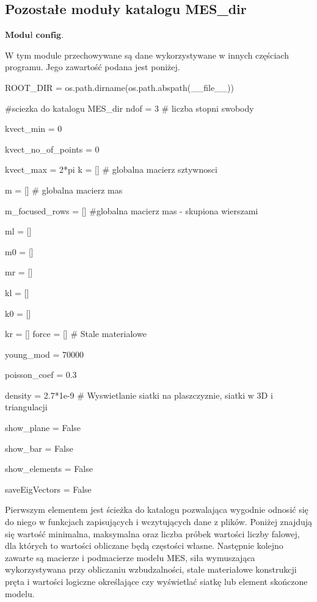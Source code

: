 
\subsection{Pozostałe moduły katalogu MES\_dir}
\label{cha:pozostale_moduly}

 \( \textbf{Moduł config} \).

W tym module przechowywane są dane wykorzystywane w innych częściach programu. Jego zawartość podana jest poniżej.

\vspace {3mm}
ROOT\_DIR = os.path.dirname(os.path.abspath(\_\_file\_\_))

\#sciezka do katalogu MES\_dir
\vspace {3mm}
ndof = 3    \# liczba stopni swobody

kvect\_min = 0

kvect\_no\_of\_points = 0

kvect\_max = 2*pi
\vspace {3mm}
k = []  \# globalna macierz sztywnosci

m = []  \# globalna macierz mas

m\_focused\_rows = [] \#globalna macierz mas - skupiona wierszami

ml = []

m0 = []

mr = []

kl = []

k0 = []

kr = []
\vspace {3mm}
force = []
\vspace {3mm}
\# Stale materialowe

young\_mod = 70000

poisson\_coef = 0.3

density = 2.7*1e-9
\vspace {3mm}
\# Wyswietlanie siatki na plaszczyznie, siatki w 3D i triangulacji

show\_plane = False

show\_bar = False

show\_elements = False

saveEigVectors = False
\vspace {3mm}

Pierwszym elementem jest ścieżka do katalogu pozwalająca wygodnie odnosić się do niego w funkcjach zapisujących i wczytujących dane z plików. Poniżej znajdują się wartość minimalna, maksymalna oraz liczba próbek wartości liczby falowej, dla których to wartości obliczane będą częstości własne. Następnie kolejno zawarte są macierze i podmacierze modelu MES, siła wymuszająca wykorzystywana przy obliczaniu wzbudzalności, stałe materiałowe konstrukcji pręta i wartości logiczne określające czy wyświetlać siatkę lub element skończone modelu.

